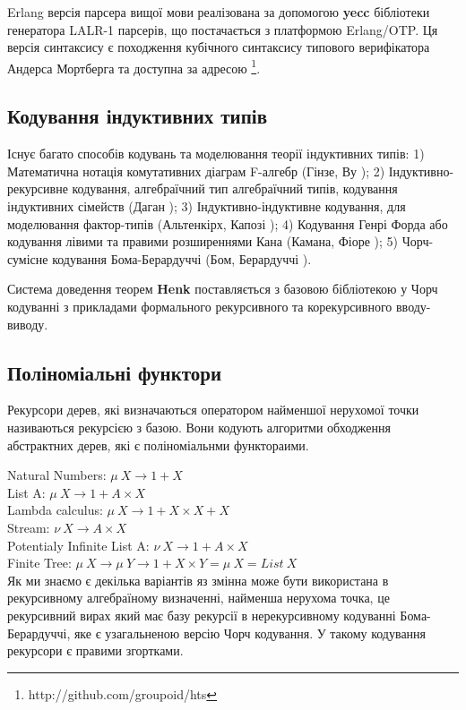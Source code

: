 \documentclass{article}
\begin{document}
Erlang версія парсера вищої мови реалізована за допомогою {\bf yecc} бібліотеки генератора LALR-1 парсерів, що постачається з платформою Erlang/OTP.
Ця версія синтаксису є походження кубічного синтаксису типового верифікатора Андерса Мортберга \cite{Mortberg17} 
та доступна за адресою \footnote{http://github.com/groupoid/hts}.

\subsection{Кодування індуктивних типів}
Існує багато способів кодувань та моделювання теорії індуктивних типів:
1) Математична нотація комутативних діаграм F-алгебр (Гінзе, Ву \cite{Hinze13});
2) Індуктивно-рекурсивне кодування, алгебраїчний тип алгебраїчний типів, кодування індуктивних сімейств (Даган \cite{Dagand13});
3) Індуктивно-індуктивне кодування, для моделювання фактор-типів (Альтенкірх, Капозі  \cite{Kaposi16});
4) Кодування Генрі Форда або кодування лівими та правими розширеннями Кана (Камана, Фіоре \cite{Hamana11});
5) Чорч-сумісне кодування Бома-Берардуччі (Бом, Берардуччі \cite{Bohm85}).

Система доведення теорем \textbf{Henk} поставляється з базовою бібліотекою у Чорч кодуванні
з прикладами формального рекурсивного та корекурсивного вводу-виводу.

\subsection{Поліноміальні функтори}
Рекурсори дерев, які визначаються оператором найменшої нерухомої точки називаються рекурсією з базою.
Вони кодують алгоритми обходження абстрактних дерев, які є поліноміальнми функтораими.

\noindent Natural Numbers: $\mu\ X \rightarrow 1 + X$\\
List A: $\mu\ X \rightarrow 1 + A \times X$\\
Lambda calculus: $\mu\ X \rightarrow 1 + X \times X + X$\\
Stream: $\nu\ X \rightarrow A \times X$\\
Potentialy Infinite List A: $\nu\ X \rightarrow 1 + A \times X$\\
Finite Tree: $\mu\ X \rightarrow \mu\ Y \rightarrow 1 + X \times Y = \mu\ X = List\ X$\\

Як ми знаємо є декілька варіантів яз змінна може бути використана в рекурсивному алгебраїному визначенні,
найменша нерухома точка, це рекурсивний вирах який має базу рекурсії в нерекурсивному кодуванні Бома-Берардуччі,
яке є узагальненою версію Чорч кодування. У такому кодування рекурсори є правими згортками.
\end{document}
